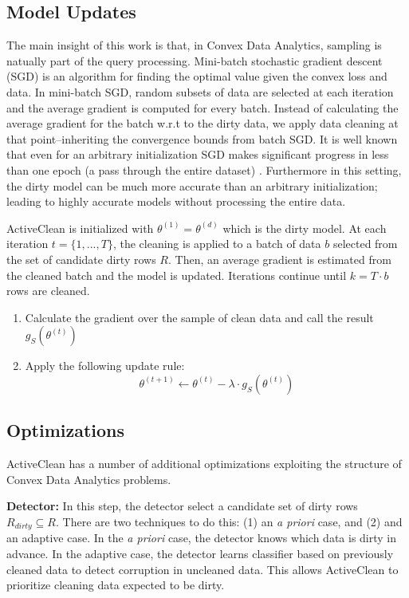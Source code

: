 \subsection{Model Updates}
The main insight of this work is that, in Convex Data Analytics, sampling is natually part of the query processing.
Mini-batch stochastic gradient descent (SGD) is an algorithm for finding the optimal value
given the convex loss and data.
In mini-batch SGD, random subsets of data are selected at each iteration and the average gradient is computed for every batch.
Instead of calculating the average gradient for the batch w.r.t to the dirty data, we apply data cleaning at that point--inheriting the convergence bounds from batch SGD.
It is well known that even for an arbitrary initialization SGD makes significant progress in less than one epoch (a pass through the entire dataset) \cite{bottou2012stochastic}.
Furthermore in this setting, the dirty model can be much more accurate than an arbitrary initialization; leading to highly accurate models without processing the entire data.

ActiveClean is initialized with $\theta^{(1)} = \theta^{(d)}$ which is the dirty model.
At each iteration $t=\{1,...,T\}$, the cleaning is applied to a batch of data $b$ selected from the set of candidate dirty rows $R$.
Then, an average gradient is estimated from the cleaned batch and the model is updated.
Iterations continue until $k = T \cdot b$ rows are cleaned.

\begin{enumerate}[noitemsep]
	\item Calculate the gradient over the sample of clean data and call the result $g_S(\theta^{(t)})$
	\item Apply the following update rule:
	\[
	\theta^{(t+1)} \leftarrow \theta^{(t)} - \lambda \cdot g_S(\theta^{(t)}) 
	\]
\end{enumerate} 

\subsection{Optimizations}
ActiveClean has a number of additional optimizations exploiting the structure of Convex Data Analytics problems.

\noindent\textbf{Detector: } In this step, the detector select a candidate set of dirty rows $R_{dirty} \subseteq R$. There are two techniques to do this: (1) an \emph{a priori} case, and (2) and an adaptive case. In the \emph{a priori} case, the detector knows which data is dirty in advance. In the adaptive case, the detector learns classifier based on previously cleaned data to detect corruption in uncleaned data. This allows ActiveClean to prioritize cleaning data expected to be dirty. 

